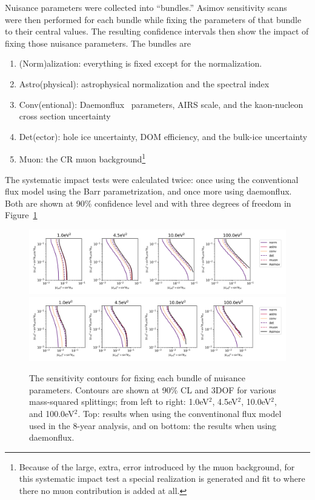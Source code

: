 \documentclass[main.tex]{subfiles}
\begin{document}
Nuisance parameters were collected into ``bundles.'' 
Asimov sensitivity scans~\cite{Cowan_2011} were then performed for each bundle while fixing the parameters of that bundle to their central values.
The resulting confidence intervals then show the impact of fixing those nuisance parameters. 
The bundles are 
\begin{enumerate}
    \item (Norm)alization: everything is fixed except for the normalization.
    \item Astro(physical): astrophysical normalization and the spectral index
    \item Conv(entional): Daemonflux~\cite{yanez2023daemonflux} parameters, AIRS scale, and the kaon-nucleon cross section uncertainty
    \item Det(ector): hole ice uncertainty, DOM efficiency, and the bulk-ice uncertainty
    \item Muon: the CR muon background\footnote{Because of the large, extra, error introduced by the muon background, for this systematic impact test a special realization is generated and fit to where there no muon contribution is added at all.}
\end{enumerate}
The systematic impact tests were calculated twice: once using the conventional flux model using the Barr parametrization, and once more using daemonflux. 
Both are shown at 90\% confidence level and with three degrees of freedom in Figure~\ref{fig:impact}

\begin{figure}
    \centering
    \includegraphics[width=0.90\linewidth]{figures/systematic_impact_joint.png}\\
    \includegraphics[width=0.90\linewidth]{figures/Systematic_impact_joint_daemon.png}
    \caption{The sensitivity contours for fixing each bundle of nuisance parameters. Contours are shown at 90\% CL and 3DOF for various mass-squared splittings; from left to right: 1.0eV$^{2}$, 4.5eV$^{2}$, 10.0eV$^{2}$, and 100.0eV$^{2}$. Top: results when using the conventinonal flux model used in the 8-year analysis, and on bottom: the results when using daemonflux.}\label{fig:impact}
\end{figure}
\end{document}
